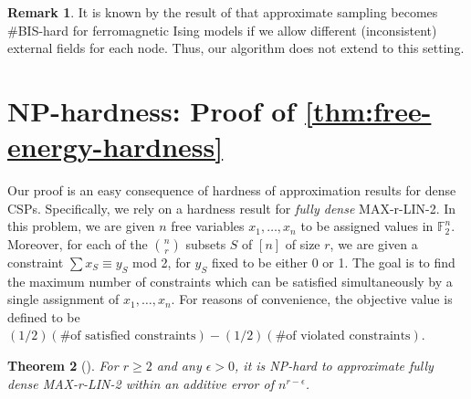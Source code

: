 \documentclass[final, 12pt]{colt2018}
\newtheorem{theorem}{Theorem}[section]
\theoremstyle{definition}
\newtheorem{remark}[theorem]{Remark}
\theoremstyle{plain}
\begin{document}
\begin{remark}
It is known by the result of \citep{Goldberg-Jerrum} that
approximate sampling becomes \#BIS-hard for ferromagnetic
Ising models if we allow different (inconsistent) external fields for each node. Thus, our algorithm does not extend to this setting.
\end{remark}

\section{NP-hardness: Proof of \cref{thm:free-energy-hardness}}
Our proof is an easy consequence of hardness of approximation results for dense CSPs. Specifically, we rely on a hardness result
for \emph{fully dense} MAX-r-LIN-2. In this problem, we are given $n$ free variables $x_1, \ldots, x_n$ to be assigned values in $\mathbb{F}_2^n$. Moreover, for each of the ${n \choose r}$ subsets $S$ of $[n]$ of size $r$, we are given a constraint $\sum x_S \equiv y_S$ mod 2, for $y_S$ fixed to be either 0 or 1. The goal is to find the maximum number of constraints which can be satisfied simultaneously by a single assignment of $x_1, \ldots, x_n$. For reasons of convenience, the objective
value is defined to be $(1/2)(\text{\# of satisfied constraints}) - (1/2)(\text{\# of violated constraints})$.
\begin{theorem}[\citet{ailon2007hardness}]
For $r \geq 2$ and any $\epsilon >0$, it is NP-hard to approximate fully dense MAX-r-LIN-2 %
within an
additive error of $n^{r - \epsilon}$. %
\end{theorem}
\end{document}
